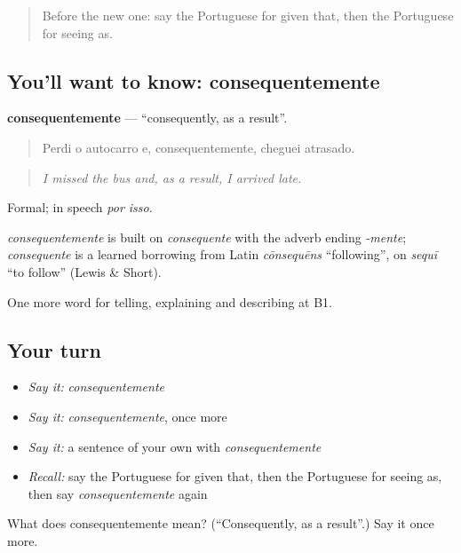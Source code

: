 \begin{quote}
Before the new one: say the Portuguese for given that, then the Portuguese for seeing as.
\end{quote}

\subsection*{You'll want to know: consequentemente}
\textbf{consequentemente} — \textquotedblleft{}consequently, as a result\textquotedblright{}.

\begin{quote}
Perdi o autocarro e, consequentemente, cheguei atrasado.
\end{quote}

\begin{quote}
\emph{I missed the bus and, as a result, I arrived late.}
\end{quote}

Formal; in speech \emph{por isso}.

\begin{cousinweb}
\emph{consequentemente} is built on \emph{consequente} with the adverb ending \emph{-mente}; \emph{consequente} is a learned borrowing from Latin \emph{cōnsequēns} \textquotedblleft{}following\textquotedblright{}, on \emph{sequī} \textquotedblleft{}to follow\textquotedblright{} (Lewis \& Short).
\end{cousinweb}

\begin{grammarlens}[title={What you've built}]
One more word for telling, explaining and describing at B1.
\end{grammarlens}

\subsection*{Your turn}
\begin{itemize}
\raggedright
  \item \emph{Say it:} \emph{consequentemente}
  \item \emph{Say it:} \emph{consequentemente}, once more
  \item \emph{Say it:} a sentence of your own with \emph{consequentemente}
  \item \emph{Recall:} say the Portuguese for given that, then the Portuguese for seeing as, then say \emph{consequentemente} again
\end{itemize}

\begin{tcolorbox}[breakable,colback=teal!4,colframe=teal!35!black,title={Before you move on}]
What does consequentemente mean? (\textquotedblleft{}Consequently, as a result\textquotedblright{}.) Say it once more.
\end{tcolorbox}
